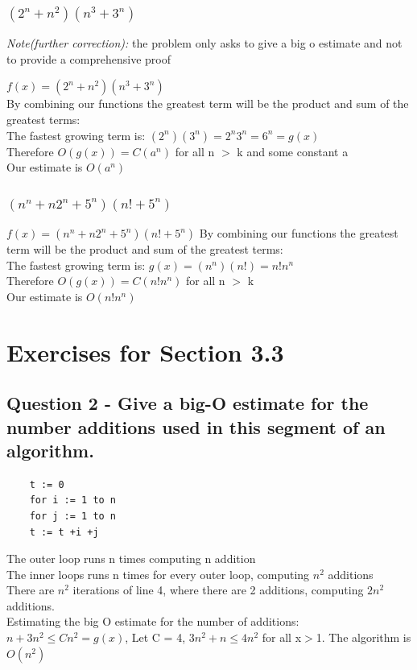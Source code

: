 \documentclass{article}
\begin{document}
\subsubsection[b]{$(2^n +n^2)(n^3 +3^n)$}
\textit{Note(further correction):} the problem only asks to give a big o estimate and not to provide a comprehensive proof\vspace{0.5cm}

\noindent
$f(x) = (2^n +n^2)(n^3 +3^n)$\\
By combining our functions the greatest term will be the product and sum of the greatest terms:\\
The fastest growing term is: $(2^n)(3^n) = 2^n3^n = 6^n = g(x)$\\
Therefore $O(g(x)) = C(a^n)$ for all n $>$ k and some constant a\\
Our estimate is $O(a^n)$

\subsubsection[c]{$(n^n +n2^n +5^n)(n!+5^n)$}
$f(x) = (n^n +n2^n +5^n)(n!+5^n)$
By combining our functions the greatest term will be the product and sum of the greatest terms:\\
The fastest growing term is: $g(x) = (n^n)(n!) = n!n^n$\\
Therefore $O(g(x)) = C(n!n^n)$ for all n $>$ k\\
Our estimate is $O(n!n^n)$

\section[3.3]{Exercises for Section 3.3}
\subsection[2]{Question 2 - Give a big-O estimate for the number additions used in
this segment of an algorithm.}

\begin{verbatim}
    t := 0
    for i := 1 to n
    for j := 1 to n
    t := t +i +j
\end{verbatim}
The outer loop runs n times computing n addition\\
The inner loops runs n times for every outer loop, computing $n^2$ additions\\
There are $n^2$ iterations of line 4, where there are 2 additions, computing $2n^2$ additions.\\
Estimating the big O estimate for the number of additions:\\
$n + 3n^2 \leq Cn^2 = g(x)$, Let C = 4, $3n^2 + n \leq 4n^2$ for all x$>$1. The algorithm is $O(n^2)$
\end{document}
